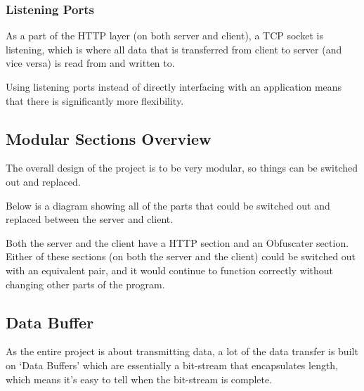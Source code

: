 \subsubsection{Listening Ports}
As a part of the HTTP layer (on both server and client), a TCP socket is listening, which is where all data that is transferred from client to server (and vice versa) is read from and written to.
\begin{center}
\end{center}
Using listening ports instead of directly interfacing with an application means that there is significantly more flexibility.

\subsection{Modular Sections Overview}
The overall design of the project is to be very modular, so things can be switched out and replaced.

Below is a diagram showing all of the parts that could be switched out and replaced between the server and client.
\begin{center}
\end{center}
Both the server and the client have a HTTP section and an Obfuscater section.
Either of these sections (on both the server and the client) could be switched out with an equivalent pair, and it would continue to function correctly without changing other parts of the program.

\subsection{Data Buffer}
As the entire project is about transmitting data, a lot of the data transfer is built on `Data Buffers' which are essentially a bit-stream that encapsulates length, which means it's easy to tell when the bit-stream is complete.

